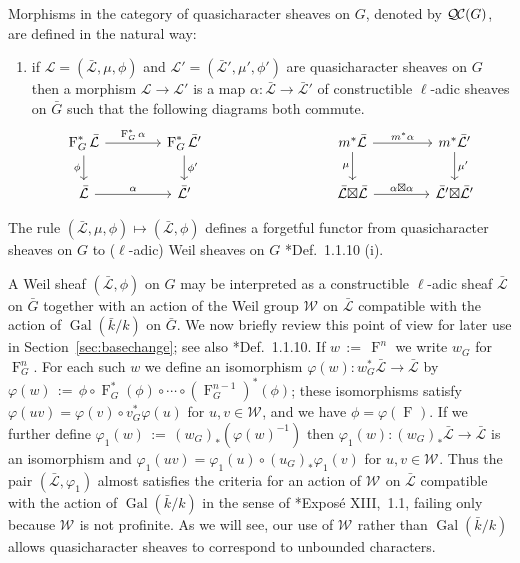\documentclass[11pt]{amsart}
\makeatletter
\theoremstyle{plain}
\theoremstyle{definition}
\theoremstyle{remark}
\newcommand{\bFq}{\bar{k}}
\newcommand{\Fq}{k}
\DeclareMathOperator{\Gal}{Gal}
\newcommand{\Frob}[1]{\operatorname{F}_{#1}}
\newcommand{\ceq}{{\, :=\, }}
\newcommand{\qcs}[1]{{\mathcal{#1}}}
\newcommand{\gqcs}[1]{{\mathcal{\bar #1}}}
\newcommand{\QC}{{\mathcal{Q\hskip-0.8pt C}}}
\newcommand{\Weil}[1]{\mathcal{W}_{#1}}
\newcommand{\labitem}[2]{%
\def\@itemlabel{\textbf{#1}}
\item
\def\@currentlabel{#1}\label{#2}}
\newcommand{\bG}{\bar{G}}
\newcommand{\tight}[3]{\hspace{-#1pt}{#2}\hspace{-#3pt}}
\newcommand{\LxL}{\text{$\gqcs{L} \tight{0}{\boxtimes}{0} \gqcs{L}$}}
\newcommand\Clifton[1]{\marginpar{\smaller\smaller CC: #1}}
\makeatother
\begin{document}
Morphisms in the category of quasicharacter sheaves on $G$, denoted by $\QC(G)$, are defined in the natural way:
\begin{enumerate}
\labitem{(QC.4)}{QC.4} if $\qcs{L} = (\gqcs{L},\mu,\phi)$ and
  $\qcs{L'} = (\gqcs{L'},\mu',\phi')$ are quasicharacter sheaves on $G$ then
  a morphism $\qcs{L} \to \qcs{L}'$ is a map $\alpha : \gqcs{L} \to \gqcs{L'}$
  of constructible $\ell$-adic sheaves on $\bG$ such that the following diagrams both commute.
  \[
  \begin{tikzcd}[column sep=40]
  \Frob{G}^* \gqcs{L} \rar{\Frob{G}^* \alpha} \arrow[swap]{d}{\phi} & \Frob{G}^* \gqcs{L'} \dar{\phi'}
  & %
  & \arrow[swap]{d}{\mu} m^* \gqcs{L} \rar{m^* \alpha} & m^* \gqcs{L'} \dar{\mu'} \\
  \gqcs{L} \rar{\alpha} & \gqcs{L'}
  & {} & \LxL \rar{\tight{1}{\alpha\boxtimes \alpha}{1}} & \gqcs{L'} \tight{0}{\boxtimes}{0} \gqcs{L'}
  \end{tikzcd}
  \]
\end{enumerate}

The rule $(\gqcs{L},\mu,\phi) \mapsto (\gqcs{L},\phi)$ defines a forgetful functor from quasicharacter
sheaves on $G$ to ($\ell$-adic) Weil sheaves on $G$ \cite{deligne:80a}*{Def.~1.1.10 (i)}.

A Weil sheaf $(\gqcs{L},\phi)$ on $G$
may be interpreted as a constructible $\ell$-adic sheaf $\gqcs{L}$ on $\bG$ together with
an action of the Weil group $\Weil{}$ on $\gqcs{L}$ compatible with the action of
$\Gal(\bFq/\Fq)$ on $\bG$. We now briefly review this point of view for later use in
Section~\ref{sec:basechange}; see also \cite{deligne:80a}*{Def.~1.1.10}.  If $w \ceq \Frob{}^n$ we write $w_G$ for $\Frob{G}^n$.
For each such $w$ we define an isomorphism $\varphi(w) : w_G^* \gqcs{L}\to \gqcs{L}$ by
$
\varphi(w) \ceq  \phi \circ \Frob{G}^*(\phi) \circ \cdots \circ (\Frob{G}^{n-1})^*(\phi)
$; 
these isomorphisms satisfy $\varphi(uv) = \varphi(v) \circ v_G^* \varphi(u)$ for $u,v\in \Weil{}$, and
we have $\phi = \varphi(\Frob{})$. 
If we further define $\varphi_1(w) \ceq (w_G)_*(\varphi(w)^{-1})$ then
$\varphi_1(w) : (w_G)_* \gqcs{L}\to \gqcs{L}$ is an isomorphism and
$\varphi_1(uv) = \varphi_1(u) \circ (u_G)_* \varphi_1(v)$ for $u,v\in \Weil{}$.
Thus the pair $(\gqcs{L},\varphi_1)$ almost satisfies the criteria for an action of $\Weil{}$
on $\gqcs{L}$ compatible with the action of $\Gal(\bFq/\Fq)$ in the sense of
\cite{deligne:SGA4.5}*{Expos\'e XIII,~1.1}, failing only because $\Weil{}$ is not profinite.
\Clifton{Improve this.}
As we will see, our use of $\Weil{}$ rather than $\Gal(\bFq/\Fq)$ allows quasicharacter sheaves to
correspond to unbounded characters.
\end{document}
